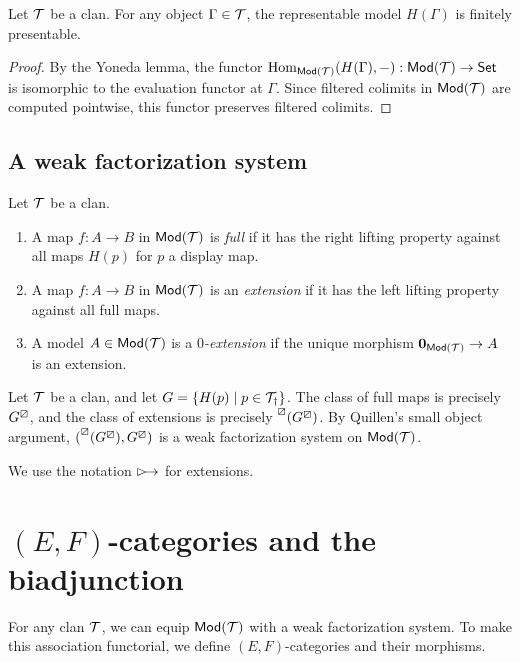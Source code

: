 \documentclass[a4paper]{article}
\begin{document}
\begin{lemma}
  Let $\mathcal{T}$ be a clan.
  For any object $\Gamma \in \mathcal{T}$, the representable model $H(\Gamma)$ is finitely presentable.
\end{lemma}
\begin{proof}
  By the Yoneda lemma, the functor $\operatorname{\mathrm{Hom}_{\mathsf{Mod}(\mathcal{T})}}(H(\Gamma),-) : \mathsf{Mod}(\mathcal{T}) \to \mathsf{Set}$ is isomorphic to the evaluation functor at $\Gamma$.
  Since filtered colimits in $\mathsf{Mod}(\mathcal{T})$ are computed pointwise, this functor preserves filtered colimits.
\end{proof}

\subsection{A weak factorization system}
\begin{definition}
  Let $\mathcal{T}$ be a clan.
  \begin{enumerate}
  \item A map $f : A \to B$ in $\mathsf{Mod}(\mathcal{T})$ is \emph{full} if it has the right lifting property against all maps $H(p)$ for $p$ a display map.
  \item A map $f : A \to B$ in $\mathsf{Mod}(\mathcal{T})$ is an \emph{extension} if it has the left lifting property against all full maps.
  \item A model $A \in \mathsf{Mod}(\mathcal{T})$ is a \emph{$0$-extension} if the unique morphism $\mathbf{0}_{\mathsf{Mod}(\mathcal{T})} \to A$ is an extension.
  \end{enumerate}
\end{definition}

\begin{remark}
  Let $\mathcal{T}$ be a clan, and let $G = \{H(p) \mid p \in \mathcal{T}_{\dag}\}$.
  The class of full maps is precisely $G^{\boxslash}$, and the class of extensions is precisely $\prescript{\boxslash}{}{(G^{\boxslash})}$.
  By Quillen's small object argument, $(\prescript{\boxslash}{}{(G^{\boxslash})},G^{\boxslash})$ is a weak factorization system on $\mathsf{Mod}(\mathcal{T})$.
\end{remark}

\begin{notation}
  We use the notation $\extension$ for extensions.
\end{notation}

\section{$(E,F)$-categories and the biadjunction}
For any clan $\mathcal{T}$, we can equip $\mathsf{Mod}(\mathcal{T})$ with a weak factorization system.
To make this association functorial, we define $(E,F)$-categories and their morphisms.
\end{document}
